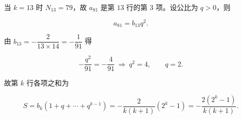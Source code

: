 \begin{answer}
当 $k=13$ 时 $N_{13}=79$，故 $a_{81}$ 是第 $13$ 行的第 $3$ 项。设公比为 $q>0$，则

\nopagebreak[4]
\[a_{81}=b_{13}q^2.\]

由 $b_{13}=-\dfrac2{13\times14}=-\dfrac1{91}$ 得

\nopagebreak[4]
\[-\frac{q^2}{91}=-\frac4{91}\ \Longrightarrow\ q^2=4,\qquad q=2.\]

故第 $k$ 行各项之和为

\nopagebreak[4]
\[S=b_k\left(1+q+\cdots+q^{k-1}\right)=-\frac{2}{k(k+1)}\left(2^k-1\right)=-\frac{2(2^k-1)}{k(k+1)}.\]


\end{answer}

